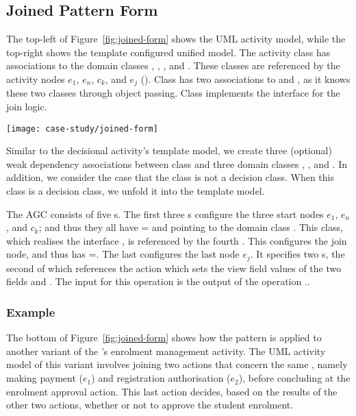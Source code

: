 \subsection{Joined Pattern Form} \label{sect:joined-pattern}

The top-left of Figure~\ref{fig:joined-form} shows the UML activity model, while the top-right shows the template configured unified model. The activity class  has associations to the domain classes , , , and . These classes are referenced by the activity nodes $ e_1 $, $ e_n $, $ c_k $, and $ e_j $ (\resp). Class  has two associations to  and , as it knows these two classes through object passing. Class  implements the interface  for the join logic.

\begin{figure*}[ht]
\begin{center}
\texttt{[image: case-study/joined-form]}
\end{center}
\caption{The joined pattern form.} %
\label{fig:joined-form}
\end{figure*}

Similar to the decisional activity's template model, we create three (optional) weak dependency associations between class  and three domain classes , , and . In addition, we consider the case that the class  is not a decision class. When this class is a decision class, we unfold it into the template model.

The AGC consists of five s. The first three s configure the three start nodes $ e_1 $, $ e_n $, and $ c_k $; and thus they all have = and  pointing to the domain class . This class, which realises the interface , is referenced by the fourth . This  configures the join node, and thus has =. The last  configures the last node $ e_j $. It specifies two s, the second of which references the action   which sets the view field values of the two fields  and . The input for this operation is the output of the operation ..
%
\subsubsection*{Example}
The bottom of Figure~\ref{fig:joined-form} shows how the pattern is applied to another variant of the \courseman's enrolment management activity. The UML activity model of this variant involves joining two actions that concern the same , namely making payment ($e_1$) and registration authorisation ($e_2$), before concluding at the enrolment approval action. This last action decides, based on the results of the other two actions, whether or not to approve the student enrolment.

